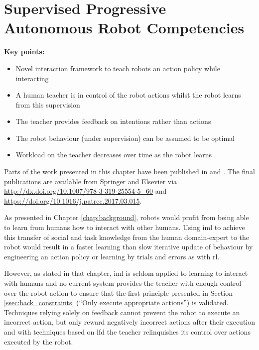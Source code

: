 \chapter{Supervised Progressive Autonomous Robot Competencies}\label{chap:sparc}

\begin{framed}
	\textbf{Key points:}
	\begin{itemize}
		\item Novel interaction framework to teach robots an action policy while interacting
		\item A human teacher is in control of the robot actions whilst the robot learns from this supervision
		\item The teacher provides feedback on intentions rather than actions
		\item The robot behaviour (under supervision) can be assumed to be optimal
		\item Workload on the teacher decreases over time as the robot learns
	\end{itemize}
\end{framed}

Parts of the work presented in this chapter have been published in \cite{senft2015sparc} and \cite{senft2017supervised}. The final publications are available from Springer and Elsevier via \url{http://dx.doi.org/10.1007/978-3-319-25554-5_60} and \url{https://doi.org/10.1016/j.patrec.2017.03.015}.

\newpage

As presented in Chapter \ref{chap:background}, robots would profit from being able to learn from humans how to interact with other humans. Using \gls{iml} to achieve this transfer of social and task knowledge from the human domain-expert to the robot would result in a faster learning than slow iterative update of behaviour by engineering an action policy or learning by trials and errors as with \gls{rl}.

However, as stated in that chapter, \gls{iml} is seldom applied to learning to interact with humans and no current system provides the teacher with enough control over the robot action to ensure that the first principle presented in Section \ref{ssec:back_constraints} (``Only execute appropriate actions'') is validated. Techniques relying solely on feedback cannot prevent the robot to execute an incorrect action, but only reward negatively incorrect actions after their execution \citep{senft2017supervised} and with techniques based on \gls{lfd} the teacher relinquishes its control over actions executed by the robot.

